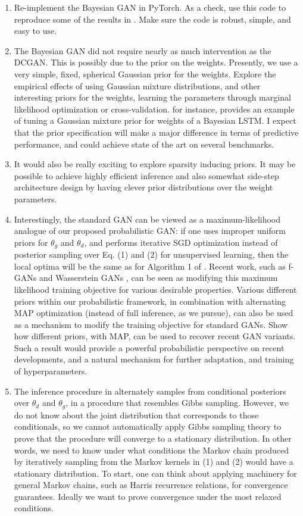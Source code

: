 \documentclass[11pt]{article}
\begin{document}
\begin{enumerate}
\item Re-implement the Bayesian GAN in PyTorch.  As a check, use this code to reproduce some of the results in \citet{saatchiwilson2017}.  Make sure the code is robust, simple, and easy to use.
\item The Bayesian GAN did not require nearly as much intervention as the DCGAN. This is possibly due to the prior on the weights.  Presently, we use a very simple, fixed, spherical Gaussian prior for the weights.  Explore the empirical effects of using Gaussian mixture distributions, and  other interesting priors for the weights, learning the parameters through marginal likelihood optimization or cross-validation.  \citet{fortunato2017bayesian} for instance, provides an example of tuning a Gaussian mixture prior for weights of a Bayesian LSTM.  I expect that the prior specification will make a major difference in terms of predictive performance, and could achieve state of the art on several benchmarks.  
\item It would also be really exciting to explore sparsity inducing priors.  It may be possible to achieve highly efficient inference and also somewhat side-step architecture design by having clever prior distributions over the weight parameters.
\item Interestingly, the standard GAN can be viewed as a maximum-likelihood analogue of our proposed probabilistic GAN: if one uses improper uniform priors for $\theta_g$ and $\theta_d$, and performs iterative SGD optimization instead of posterior sampling over Eq. (1) and (2) for unsupervised learning, then the local optima will be the same as for Algorithm 1 of \citep{goodfellow2014generative}.  Recent work, such as f-GANs \citep{nowozin2016} and Wasserstein GANs \citep{arjovsky2017wasserstein}, can be seen as modifying this maximum likelihood training objective for various desirable properties.  Various different priors within our probabilistic framework, in combination with alternating MAP optimization (instead of full inference, as we pursue), can also be used as a mechanism to modify the training objective for standard GANs.  Show how different priors, with MAP, can be used to recover recent GAN variants.  Such a result would provide a powerful probabilistic perspective on recent developments, and a natural mechanism for further adaptation, and training of hyperparameters.
\item The inference procedure in \citet{saatchiwilson2017} alternately samples from conditional posteriors over $\theta_d$ and $\theta_g$, in a procedure that resembles Gibbs sampling.  However, we do not know about the joint distribution that corresponds to those conditionals, so we cannot automatically apply Gibbs sampling theory to prove that the procedure will converge to a stationary distribution.  In other words, we need to know under what conditions the Markov chain produced by iteratively sampling from the Markov kernels in (1) and (2) would have a stationary distribution.   To start, one can think about applying machinery for general Markov chains, such as Harris recurrence relations, for convergence guarantees.  Ideally we want to prove convergence under the most relaxed conditions.

\end{enumerate}
\end{document}

